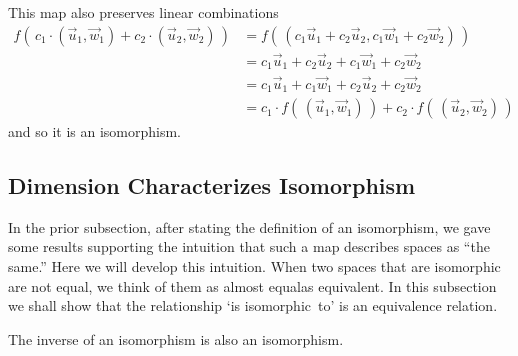 \begin{exercises}
\begin{answer}
\begin{exparts}
          This map also preserves linear combinations
          \begin{align*}
            f(\,c_1\cdot(\vec{u}_1,\vec{w}_1)+c_2\cdot (\vec{u}_2,\vec{w}_2)\,)
            &=f(\,(c_1\vec{u}_1+c_2\vec{u}_2,c_1\vec{w}_1+c_2\vec{w}_2)\,) \\
            &=c_1\vec{u}_1+c_2\vec{u}_2+c_1\vec{w}_1+c_2\vec{w}_2    \\
            &=c_1\vec{u}_1+c_1\vec{w}_1+c_2\vec{u}_2+c_2\vec{w}_2    \\
            &=c_1\cdot f(\,(\vec{u}_1,\vec{w}_1)\,)
               +c_2\cdot f(\,(\vec{u}_2,\vec{w}_2)\,)
          \end{align*}
          and so it is an isomorphism.
      \end{exparts}     
    \end{answer}
\end{exercises}












\subsection{Dimension Characterizes Isomorphism}

In the prior subsection, after stating the definition of an isomorphism,
we gave some results supporting the intuition that such a map describes 
spaces as ``the same.'' 
Here we will develop this intuition.
When two spaces that are isomorphic are not equal, we think of them
as almost equal\Dash as equivalent.
In this subsection 
we shall show that the relationship `is isomorphic~to' is an equivalence
relation.

\begin{lemma}  \label{lem:IsoInvAlsoIso}
The inverse of an isomorphism is also an isomorphism.
\end{lemma}

